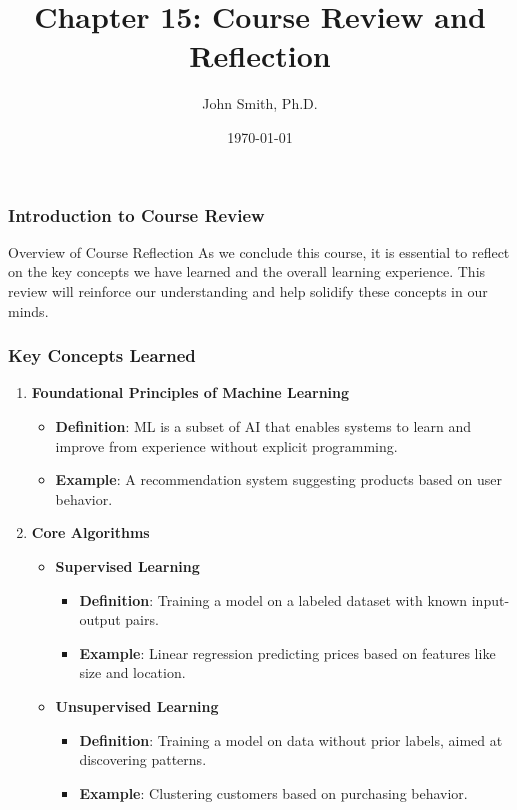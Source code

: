\documentclass[aspectratio=169]{beamer}
\title[Course Review and Reflection]{Chapter 15: Course Review and Reflection}
\author[J. Smith]{John Smith, Ph.D.}
\institute[University Name]{
  Department of Computer Science\\
  University Name\\
  \vspace{0.3cm}
  Email: email@university.edu\\
  Website: www.university.edu
}
\date{\today}
\begin{document}
\frame{\titlepage}

\begin{frame}[fragile]
    \frametitle{Introduction to Course Review}
    \begin{block}{Overview of Course Reflection}
        As we conclude this course, it is essential to reflect on the key concepts we have learned and the overall learning experience. 
        This review will reinforce our understanding and help solidify these concepts in our minds.
    \end{block}
\end{frame}

\begin{frame}[fragile]
    \frametitle{Key Concepts Learned}
    \begin{enumerate}
        \item \textbf{Foundational Principles of Machine Learning}
        \begin{itemize}
            \item \textbf{Definition}: ML is a subset of AI that enables systems to learn and improve from experience without explicit programming.
            \item \textbf{Example}: A recommendation system suggesting products based on user behavior.
        \end{itemize}

        \item \textbf{Core Algorithms}
        \begin{itemize}
            \item \textbf{Supervised Learning}
            \begin{itemize}
                \item \textbf{Definition}: Training a model on a labeled dataset with known input-output pairs.
                \item \textbf{Example}: Linear regression predicting prices based on features like size and location.
            \end{itemize}
            \item \textbf{Unsupervised Learning}
            \begin{itemize}
                \item \textbf{Definition}: Training a model on data without prior labels, aimed at discovering patterns.
                \item \textbf{Example}: Clustering customers based on purchasing behavior.
            \end{itemize}
        \end{itemize}
    \end{enumerate}
\end{frame}
\end{document}
